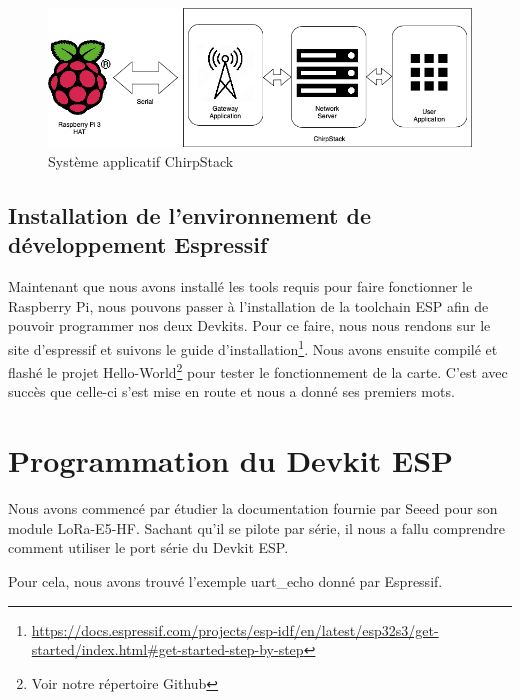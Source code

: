 \documentclass{article}
\begin{document}
				\begin{figure}[H]
					\centering
					\includegraphics[width=0.7\linewidth]{Systeme_ChirpStack}
					\caption{Système applicatif ChirpStack}
					\label{fig:systemechirpstack}
				\end{figure}
				
		\subsection{Installation de l'environnement de développement Espressif}
			Maintenant que nous avons installé les tools requis pour faire fonctionner le Raspberry Pi, nous pouvons passer à l'installation de la toolchain ESP afin de pouvoir programmer nos deux Devkits. 
			\newline
			\newline
			Pour ce faire, nous nous rendons sur le site d'espressif et suivons le guide d'installation\footnote{\url{https://docs.espressif.com/projects/esp-idf/en/latest/esp32s3/get-started/index.html\#get-started-step-by-step}}. 
			\newline
			Nous avons ensuite compilé et flashé le projet Hello-World\footnote{Voir notre répertoire Github} pour tester le fonctionnement de la carte. C'est avec succès que celle-ci s'est mise en route et nous a donné ses premiers mots.
			
	\section{Programmation du Devkit ESP}
		Nous avons commencé par étudier la documentation fournie par Seeed pour son  module LoRa-E5-HF. Sachant qu'il se pilote par série, il nous a fallu comprendre comment utiliser le port série du Devkit ESP.
		
		Pour cela, nous avons trouvé l'exemple uart\_echo donné par Espressif.
		
\end{document}
